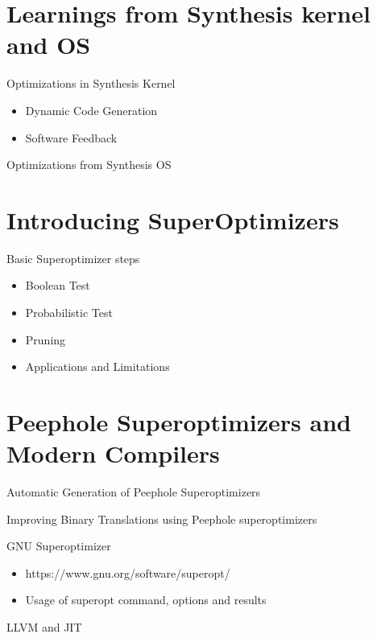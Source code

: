 \documentclass[10pt,aspectratio=\ratio,
compress
]{beamer}
\begin{document}
\section{Learnings from Synthesis kernel and OS}
\begin{frame}{Optimizations in Synthesis Kernel}
\begin{itemize}
\item Dynamic Code Generation
\item Software Feedback
\end{itemize}
\end{frame}

\begin{frame}{Optimizations from Synthesis OS}

\end{frame}

\section{Introducing SuperOptimizers}
\begin{frame}{Basic Superoptimizer steps}
\begin{itemize}
\item Boolean Test
\item Probabilistic Test
\item Pruning
\item Applications and Limitations
\end{itemize}
\end{frame}

\section{Peephole Superoptimizers and Modern Compilers}
\begin{frame}{Automatic Generation of Peephole Superoptimizers}
\end{frame}
\begin{frame}{Improving Binary Translations using Peephole superoptimizers}
\end{frame}
\begin{frame}{GNU Superoptimizer}
\begin{itemize}
\item https://www.gnu.org/software/superopt/
\item Usage of superopt command, options and results
\end{itemize}
\end{frame}
\begin{frame}{LLVM and JIT}
\end{frame}
\end{document}
